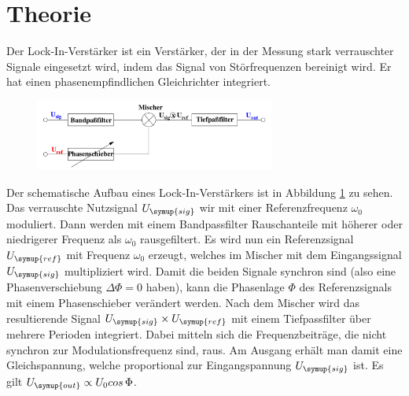 \section{Theorie}
\label{sec:Theorie}
  Der Lock-In-Verstärker ist ein Verstärker, der in der Messung stark verrauschter
  Signale eingesetzt wird, indem das Signal von Störfrequenzen bereinigt wird.
  Er hat einen phasenempfindlichen Gleichrichter integriert.
  \begin{figure}
    \centering
    \includegraphics[width=0.7\textwidth]{aufbau.png}
    \label{fig:aufbau}
  \end{figure}
  Der schematische Aufbau eines Lock-In-Verstärkers ist in Abbildung \ref{fig:aufbau}
  zu sehen.
  Das verrauschte Nutzsignal $U_\symup{sig}$ wir mit einer Referenzfrequenz $\omega_0$
  moduliert. Dann werden mit einem Bandpassfilter Rauschanteile mit höherer oder
  niedrigerer Frequenz als $\omega_0$ rausgefiltert.
  Es wird nun ein Referenzsignal $U_\symup{ref}$ mit Frequenz $\omega_0$ erzeugt,
  welches im Mischer mit dem Eingangssignal $U_\symup{sig}$ multipliziert wird.
  Damit die beiden Signale synchron sind (also eine Phasenverschiebung
  $\Delta\Phi=0$ haben), kann die Phasenlage $\Phi$ des Referenzsignals mit einem
  Phasenschieber verändert werden.
  Nach dem Mischer wird das resultierende Signal $U_\symup{sig} \times U_\symup{ref}$
  mit einem Tiefpassfilter über mehrere Perioden integriert. Dabei mitteln sich
  die Frequenzbeiträge, die nicht synchron zur Modulationsfrequenz sind, raus.
  Am Ausgang erhält man damit eine Gleichspannung, welche proportional zur
  Eingangspannung $U_\symup{sig}$ ist. Es gilt $U_\symup{out}\propto U_0 cos\,\Phi$.
\cite{sample}
